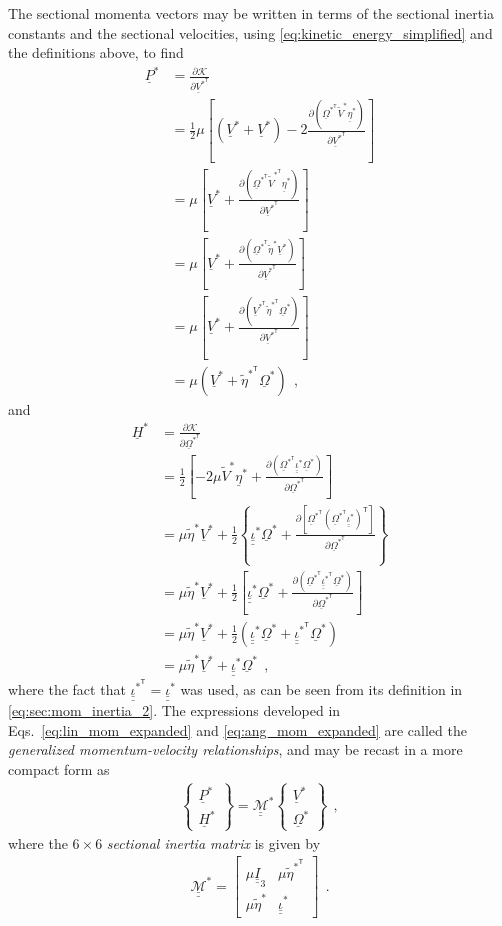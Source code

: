 \documentclass[12pt,a4paper,oneside,english]{abntex2} %
\newcommand{\vect}[1]{\underline{#1}}
\newcommand{\del}[2]{\frac{\partial#1}{\partial#2}}
\def\tens#1{\underline{\underline{#1}}}
\def\til#1{\widetilde{#1}}
\def\lb{\left[}
\def\rb{\right]}
\def\lp{\left(}
\def\rp{\right)}
\def\T{\mathsf{T}}
\def\Ithree{\tens{I}_3}
\def\etas{\vect{\eta}^*}
\def\etatils{\til{\eta}^*}
\def\etatilsT{\til{\eta}^{*^\T}}
\def\iotas{\tens{\iota}^*}
\def\iotasT{\tens{\iota}^{*^\T}}
\def\V{\vect{V}}
\def\Vs{\V^{*}}
\def\VsT{\V^{*^\T}}
\def\Vtils{\til{V}^{*}}
\def\VtilsT{\til{V}^{*^\T}}
\def\Om{\vect{\Omega}}
\def\Oms{\Om^{*}}
\def\OmsT{\Om^{*^\T}}
\def\P{\vect{P}}
\def\Ps{\P^*}
\def\Hv{\vect{H}}
\def\Hvs{\Hv^*}
\def\Mass{\mathcal{\tens{M}}^*}
\begin{document}
The sectional momenta vectors may be written in terms of the sectional inertia constants and the sectional velocities, using \cref{eq:kinetic_energy_simplified} and the definitions above, to find
\begin{align}
    \Ps &= \del{\mathcal{K}}{\VsT} \nonumber 
    \\
    &= \frac{1}{2}\mu\lb \lp\Vs+\Vs\rp - 2\frac{\partial\lp\OmsT\Vtils\etas\rp}{\partial\VsT} \rb \nonumber 
    \\
    &= \mu\lb \Vs + \frac{\partial\lp\OmsT\VtilsT\etas\rp}{\partial\VsT} \rb \nonumber 
    \\
    &= \mu\lb \Vs + \frac{\partial\lp\OmsT\etatils\Vs\rp}{\partial\VsT} \rb \nonumber 
    \\
    &= \mu\lb \Vs + \frac{\partial\lp\VsT\etatilsT\Oms\rp}{\partial\VsT} \rb \nonumber 
    \\
    &= \mu \lp \Vs + \etatilsT\Oms \rp \ \ ,
    \label{eq:lin_mom_expanded}
\end{align}
and 
\begin{align}
    \Hvs &= \del{\mathcal{K}}{\OmsT} \nonumber 
    \\
    &= \frac{1}{2}\lb -2\mu\Vtils\etas + \frac{\partial\lp\OmsT\iotas\Oms\rp}{\partial\OmsT} \rb \nonumber 
    \\
    &= \mu\etatils\Vs + \frac{1}{2}\left\{ \iotas\Oms + \frac{\partial\lb\OmsT\lp\OmsT\iotas\rp^\T\rb}{\partial\OmsT} \right\} \nonumber
    \\
    &= \mu\etatils\Vs + \frac{1}{2}\lb \iotas\Oms + \frac{\partial\lp\OmsT\iotasT\Oms\rp}{\partial\OmsT} \rb \nonumber 
    \\
    &= \mu\etatils\Vs + \frac{1}{2}\lp \iotas\Oms + \iotasT\Oms \rp \nonumber 
    \\
    &= \mu\etatils\Vs + \iotas\Oms \ \ ,
    \label{eq:ang_mom_expanded}
\end{align}
where the fact that $\iotasT = \iotas$ was used, as can be seen from its definition in \cref{eq:sec:mom_inertia_2}. The expressions developed in Eqs.~\eqref{eq:lin_mom_expanded} and \eqref{eq:ang_mom_expanded} are called the \textit{generalized momentum-velocity relationships}, and may be recast in a more compact form as
\begin{align}
    \begin{Bmatrix}
    \Ps \\ \Hvs
    \end{Bmatrix}
    = \Mass
    \begin{Bmatrix}
    \Vs \\ \Oms
    \end{Bmatrix} \ \ ,
    \label{eq:mom_vel}
\end{align}
where the $6 \times 6$ \textit{sectional inertia matrix} is given by
\begin{align}
    \Mass = 
    \begin{bmatrix}
    \mu\Ithree & \mu\etatilsT\\ 
    \mu\etatils & \iotas
    \end{bmatrix} \ \ .
    \label{eq:M}
\end{align}
\end{document}
